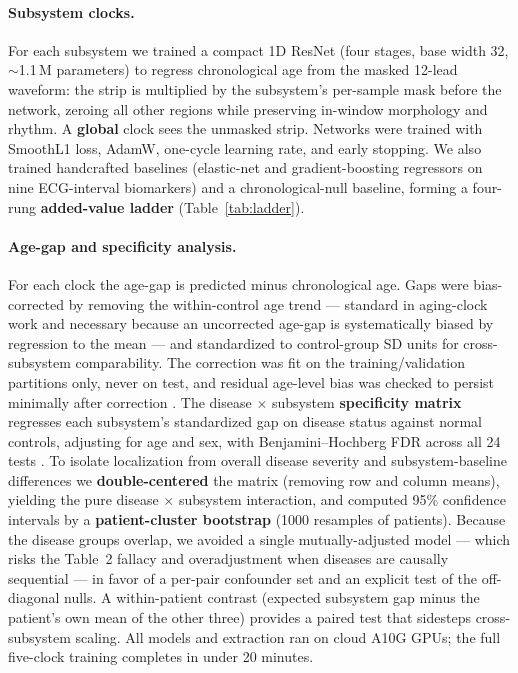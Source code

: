 \documentclass[11pt]{article}
\begin{document}
\paragraph{Subsystem clocks.}
For each subsystem we trained a compact 1D ResNet (four stages, base width 32, $\sim$1.1\,M
parameters) to regress chronological age from the masked 12-lead waveform: the strip is
multiplied by the subsystem's per-sample mask before the network, zeroing all other regions
while preserving in-window morphology and rhythm. A \textbf{global} clock sees the unmasked
strip. Networks were trained with SmoothL1 loss, AdamW, one-cycle learning rate, and early
stopping. We also trained handcrafted baselines (elastic-net and gradient-boosting regressors
on nine ECG-interval biomarkers) and a chronological-null baseline, forming a four-rung
\textbf{added-value ladder} (Table~\ref{tab:ladder}).

\paragraph{Age-gap and specificity analysis.}
For each clock the age-gap is predicted minus chronological age. Gaps were bias-corrected by
removing the within-control age trend --- standard in aging-clock work and necessary because an
uncorrected age-gap is systematically biased by regression to the mean
\citep{beheshti2019biascorr, delange2020biascorr} --- and standardized to control-group SD
units for cross-subsystem comparability. The correction was fit on the training/validation
partitions only, never on test, and residual age-level bias was checked to persist minimally
after correction \citep{zhang2023residualbias}. The disease $\times$ subsystem
\textbf{specificity matrix} regresses each subsystem's standardized gap on disease status
against normal controls, adjusting for age and sex, with Benjamini--Hochberg FDR across all 24
tests \citep{benjamini1995fdr}. To isolate localization from overall disease severity and
subsystem-baseline differences we \textbf{double-centered} the matrix (removing row and column
means), yielding the pure disease $\times$ subsystem interaction, and computed 95\% confidence
intervals by a \textbf{patient-cluster bootstrap} (1000 resamples of patients). Because the
disease groups overlap, we avoided a single mutually-adjusted model --- which risks the
Table~2 fallacy and overadjustment when diseases are causally sequential
\citep{westreich2013table2} --- in favor of a per-pair confounder set and an explicit test of
the off-diagonal nulls. A within-patient contrast (expected subsystem gap minus the patient's
own mean of the other three) provides a paired test that sidesteps cross-subsystem scaling.
All models and extraction ran on cloud A10G GPUs; the full five-clock training completes in
under 20 minutes.
\end{document}
